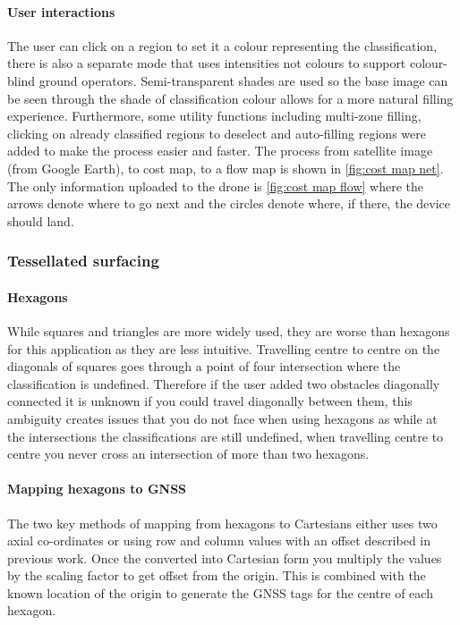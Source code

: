 \paragraph{User interactions}
The user can click on a region to set it a colour representing the classification, there is also a separate mode that uses intensities not colours to support colour-blind ground operators. Semi-transparent shades are used so the base image can be seen through the shade of classification colour allows for a more natural filling experience. Furthermore, some utility functions including multi-zone filling, clicking on already classified regions to deselect and auto-filling regions were added to make the process easier and faster. The process from satellite image (from Google Earth), to cost map, to a flow map is shown in \ref{fig:cost map net}. The only information uploaded to the drone is \ref{fig:cost map flow} where the arrows denote where to go next and the circles denote where, if there, the device should land.

\subsubsection{Tessellated surfacing}
\paragraph{Hexagons} While squares and triangles are more widely used, they are worse than hexagons for this application as they are less intuitive. Travelling centre to centre on the diagonals of squares goes through a point of four intersection where the classification is undefined. Therefore if the user added two obstacles diagonally connected it is unknown if you could travel diagonally between them, this ambiguity creates issues that you do not face when using hexagons as while at the intersections the classifications are still undefined, when travelling centre to centre you never cross an intersection of more than two hexagons.
\paragraph{Mapping hexagons to \gls{GNSS}} \label{para:Mapping hexagons}
The two key methods of mapping from hexagons to Cartesians either uses two axial co-ordinates or using row and column values with an offset described in previous work\cite{MappingHexagons}. Once the converted into Cartesian form you multiply the values by the scaling factor to get offset from the origin. This is combined with the known location of the origin to generate the \gls{GNSS} tags for the centre of each hexagon.

